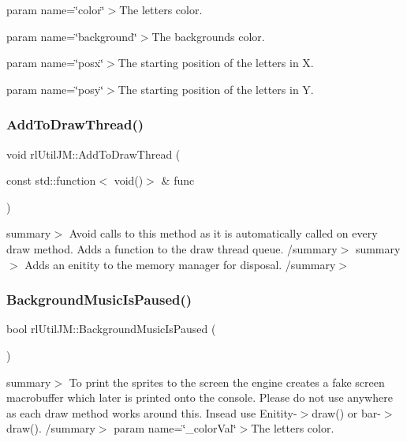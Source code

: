 param name=\char`\"{}color\char`\"{}$>$The letter\textquotesingle{}s color.

param name=\char`\"{}background\char`\"{}$>$The background\textquotesingle{}s color.

param name=\char`\"{}posx\char`\"{}$>$The starting position of the letters in X.

param name=\char`\"{}posy\char`\"{}$>$The starting position of the letters in Y.\mbox{\label{classrl_util_j_m_adb7f531e1a2608a1d733be327a5bb528}} 
\subsubsection{\texorpdfstring{Add\+To\+Draw\+Thread()}{AddToDrawThread()}}
{\footnotesize\ttfamily void rl\+Util\+J\+M\+::\+Add\+To\+Draw\+Thread (\begin{DoxyParamCaption}\item[{const std\+::function$<$ void()$>$ \&}]{func }\end{DoxyParamCaption})\hspace{0.3cm}{\ttfamily [static]}}

summary$>$ Avoid calls to this method as it is automatically called on every draw method. Adds a function to the draw thread queue. /summary$>$ summary$>$ Adds an enitity to the memory manager for disposal. /summary$>$ \mbox{\label{classrl_util_j_m_ac82d68787a3e359f545b4b6af149108e}} 
\subsubsection{\texorpdfstring{Background\+Music\+Is\+Paused()}{BackgroundMusicIsPaused()}}
{\footnotesize\ttfamily bool rl\+Util\+J\+M\+::\+Background\+Music\+Is\+Paused (\begin{DoxyParamCaption}{ }\end{DoxyParamCaption})\hspace{0.3cm}{\ttfamily [static]}}

summary$>$ To print the sprites to the screen the engine creates a fake screen macrobuffer which later is printed onto the console. Please do not use anywhere as each draw method works around this. Insead use Enitity-\/$>$draw() or bar-\/$>$draw(). /summary$>$ param name=\char`\"{}\+\_\+color\+Val\char`\"{}$>$The letter\textquotesingle{}s color.


